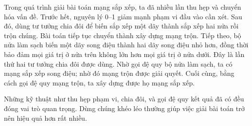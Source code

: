\documentclass[11pt]{article}
\begin{document}
Trong quá trình giải bài toán mạng sắp xếp, ta đã nhiều lần thu hẹp và chuyển
hóa vấn đề. Trước hết, nguyên lý 0--1 giảm mạnh phạm vi đầu vào cần xét. Sau
đó, dùng tư tưởng chia đôi để biến sắp xếp một dãy thành sắp xếp hai nửa rồi
trộn chúng. Bài toán tiếp tục chuyển thành xây dựng mạng trộn. Tiếp theo, bộ
nửa làm sạch biến một dãy song điệu thành hai dãy song điệu nhỏ hơn, đồng
thời bảo đảm mọi giá trị ở nửa trên không lớn hơn mọi giá trị ở nửa dưới. Đây
là lần thứ hai tư tưởng chia đôi được dùng. Nhờ gọi đệ quy bộ nửa làm sạch, ta
có mạng sắp xếp song điệu; nhờ đó mạng trộn được giải quyết. Cuối cùng, bằng
cách gọi đệ quy mạng trộn, ta xây dựng được họ mạng sắp xếp.

Những kỹ thuật như thu hẹp phạm vi, chia đôi, và gọi đệ quy kết quả đã có đều
đóng vai trò quan trọng. Dùng chúng khéo léo thường giúp việc giải bài toán
trở nên hiệu quả hơn rất nhiều.
\end{document}

